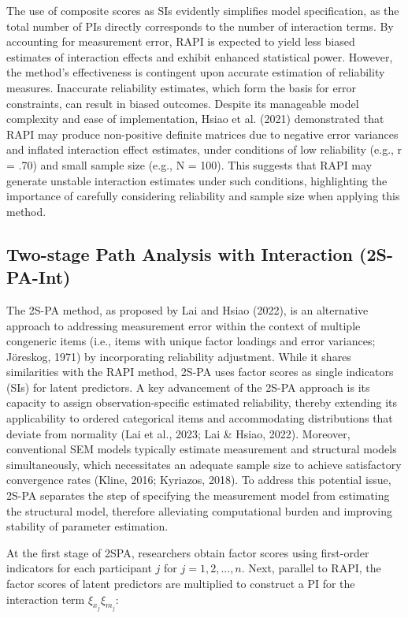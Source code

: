 \documentclass[
  man]{apa6}
\begin{document}
The use of composite scores as SIs evidently simplifies model specification, as the total number of PIs directly corresponds to the number of interaction terms. By accounting for measurement error, RAPI is expected to yield less biased estimates of interaction effects and exhibit enhanced statistical power. However, the method's effectiveness is contingent upon accurate estimation of reliability measures. Inaccurate reliability estimates, which form the basis for error constraints, can result in biased outcomes. Despite its manageable model complexity and ease of implementation, Hsiao et al. (2021) demonstrated that RAPI may produce non-positive definite matrices due to negative error variances and inflated interaction effect estimates, under conditions of low reliability (e.g., r = .70) and small sample size (e.g., N = 100). This suggests that RAPI may generate unstable interaction estimates under such conditions, highlighting the importance of carefully considering reliability and sample size when applying this method.

\subsection{Two-stage Path Analysis with Interaction (2S-PA-Int)}\label{two-stage-path-analysis-with-interaction-2s-pa-int}

The 2S-PA method, as proposed by Lai and Hsiao (2022), is an alternative approach to addressing measurement error within the context of multiple congeneric items (i.e., items with unique factor loadings and error variances; Jöreskog, 1971) by incorporating reliability adjustment. While it shares similarities with the RAPI method, 2S-PA uses factor scores as single indicators (SIs) for latent predictors. A key advancement of the 2S-PA approach is its capacity to assign observation-specific estimated reliability, thereby extending its applicability to ordered categorical items and accommodating distributions that deviate from normality (Lai et al., 2023; Lai \& Hsiao, 2022). Moreover, conventional SEM models typically estimate measurement and structural models simultaneously, which necessitates an adequate sample size to achieve satisfactory convergence rates (Kline, 2016; Kyriazos, 2018). To address this potential issue, 2S-PA separates the step of specifying the measurement model from estimating the structural model, therefore alleviating computational burden and improving stability of parameter estimation.

At the first stage of 2SPA, researchers obtain factor scores using first-order indicators for each participant \(j\) for \(j = 1, 2, ..., n\). Next, parallel to RAPI, the factor scores of latent predictors are multiplied to construct a PI for the interaction term \(\xi_{x_{j}}\xi_{m_{j}}\):
\end{document}
